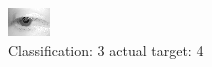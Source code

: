 \begin{figure}[h!]
\begin{center}
\includegraphics[width=0.60\columnwidth]{figures/ID2653_class_3_target_4.png}
\end{center}
\caption{ Classification: 3 actual target: 4}
\label{fig:ID2653_class_3_target_4}
\end{figure}

